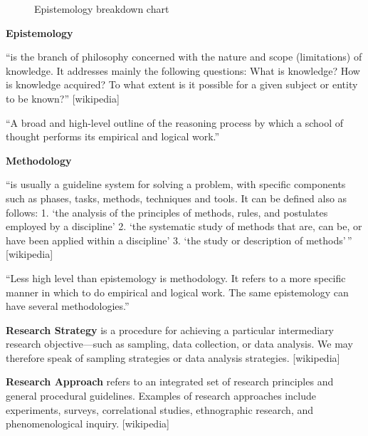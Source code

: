 \begin{figure}[htb]
  \centering
  \caption[Epistemology]{Epistemology breakdown chart}
\label{fig:method}
\end{figure}

\textbf{Epistemology}

``is the branch of philosophy concerned with the nature and scope (limitations) of knowledge. It addresses mainly the following questions: What is knowledge? How is knowledge acquired? To what extent is it possible for a given subject or entity to be known?'' [wikipedia]

``A broad and high-level outline of the reasoning process by which a school of thought performs its empirical and logical work.'' \autocite{Mingers2004}

\textbf{Methodology}

``is usually a guideline system for solving a problem, with specific components such as phases, tasks, methods, techniques and tools. It can be defined also as follows: 1.	`the analysis of the principles of methods, rules, and postulates employed by a discipline' 2.	`the systematic study of methods that are, can be, or have been applied within a discipline' 3.	`the study or description of methods'\,'' [wikipedia]

``Less high level than epistemology is methodology. It refers to a more specific manner in which to do empirical and logical work. The same epistemology can have several methodologies.'' \autocite{Mingers2004}

\textbf{Research Strategy}
is a procedure for achieving a particular intermediary research objective—such as sampling, data collection, or data analysis. We may therefore speak of sampling strategies or data analysis strategies. [wikipedia]

\textbf{Research Approach}
refers to an integrated set of research principles and general procedural guidelines. Examples of research approaches include experiments, surveys, correlational studies, ethnographic research, and phenomenological inquiry. [wikipedia]

